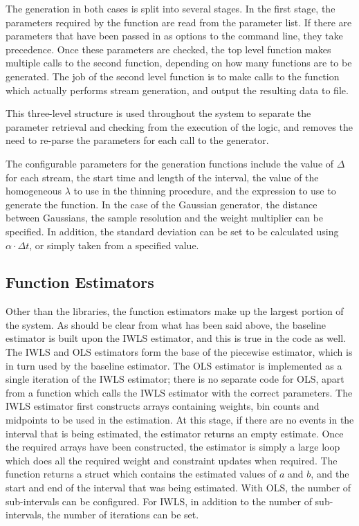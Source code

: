 \documentclass[a4paper,11pt]{article}
\begin{document}
   The generation in both cases is split into several stages. In the first
   stage, the parameters required by the function are read from the parameter
   list. If there are parameters that have been passed in as options to the
   command line, they take precedence. Once these parameters are checked, the
   top level function makes multiple calls to the second function, depending on
   how many functions are to be generated. The job of the second level function
   is to make calls to the function which actually performs stream generation,
   and output the resulting data to file.

   This three-level structure is used throughout the system to separate the
   parameter retrieval and checking from the execution of the logic, and removes
   the need to re-parse the parameters for each call to the generator.

   The configurable parameters for the generation functions include the value
   of $\Delta$ for each stream, the start time and length of the interval, the
   value of the homogeneous $\lambda$ to use in the thinning procedure, and the
   expression to use to generate the function. In the case of the Gaussian
   generator, the distance between Gaussians, the sample resolution and the
   weight multiplier can be specified. In addition, the standard deviation can
   be set to be calculated using $\alpha\cdot\Delta t$, or simply taken from a
   specified value.
\subsection{Function Estimators}
\label{sec-6-7}

   Other than the libraries, the function estimators make up the largest portion
   of the system. As should be clear from what has been said above, the baseline
   estimator is built upon the IWLS estimator, and this is true in the code as
   well. The IWLS and OLS estimators form the base of the piecewise estimator,
   which is in turn used by the baseline estimator. The OLS estimator is
   implemented as a single iteration of the IWLS estimator; there is no separate
   code for OLS, apart from a function which calls the IWLS estimator with the
   correct parameters. The IWLS estimator first constructs arrays containing
   weights, bin counts and midpoints to be used in the estimation. At this
   stage, if there are no events in the interval that is being estimated, the
   estimator returns an empty estimate. Once the required arrays have been
   constructed, the estimator is simply a large loop which does all the required
   weight and constraint updates when required. The function returns a struct
   which contains the estimated values of $a$ and $b$, and the start and end of
   the interval that was being estimated. With OLS, the number of sub-intervals
   can be configured. For IWLS, in addition to the number of sub-intervals, the
   number of iterations can be set.
\end{document}
